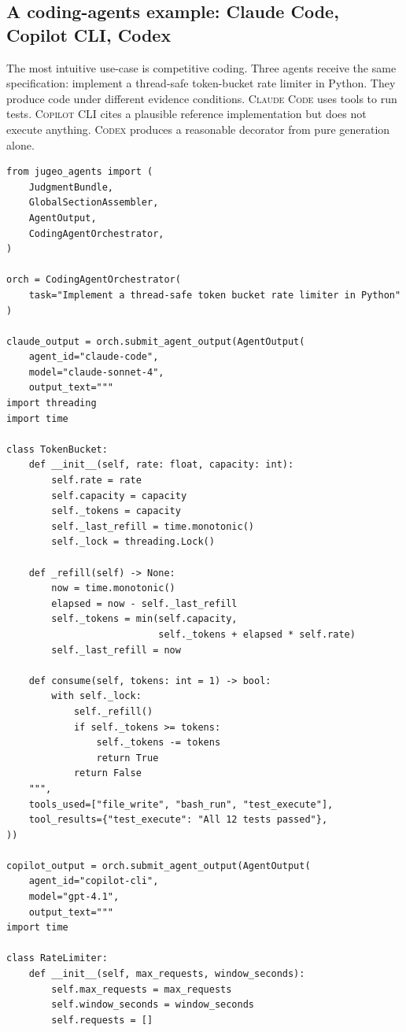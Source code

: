 \documentclass[11pt]{article}
\newcommand{\ClaudeCode}{\textsc{Claude Code}}
\newcommand{\CopilotCLI}{\textsc{Copilot CLI}}
\newcommand{\CodexCLI}{\textsc{Codex}}
\begin{document}
\subsection{A coding-agents example: Claude Code, Copilot CLI, Codex}

The most intuitive use-case is competitive coding.  Three agents receive the
same specification: implement a thread-safe token-bucket rate limiter in
Python.  They produce code under different evidence conditions.
\ClaudeCode{} uses tools to run tests.  \CopilotCLI{} cites a plausible
reference implementation but does not execute anything.  \CodexCLI{} produces a
reasonable decorator from pure generation alone.

\begin{lstlisting}[style=jugeo-python,caption={Competitive coding with three agent CLIs.},label={lst:coding-agents}]
from jugeo_agents import (
    JudgmentBundle,
    GlobalSectionAssembler,
    AgentOutput,
    CodingAgentOrchestrator,
)

orch = CodingAgentOrchestrator(
    task="Implement a thread-safe token bucket rate limiter in Python"
)

claude_output = orch.submit_agent_output(AgentOutput(
    agent_id="claude-code",
    model="claude-sonnet-4",
    output_text="""
import threading
import time

class TokenBucket:
    def __init__(self, rate: float, capacity: int):
        self.rate = rate
        self.capacity = capacity
        self._tokens = capacity
        self._last_refill = time.monotonic()
        self._lock = threading.Lock()

    def _refill(self) -> None:
        now = time.monotonic()
        elapsed = now - self._last_refill
        self._tokens = min(self.capacity,
                           self._tokens + elapsed * self.rate)
        self._last_refill = now

    def consume(self, tokens: int = 1) -> bool:
        with self._lock:
            self._refill()
            if self._tokens >= tokens:
                self._tokens -= tokens
                return True
            return False
    """,
    tools_used=["file_write", "bash_run", "test_execute"],
    tool_results={"test_execute": "All 12 tests passed"},
))

copilot_output = orch.submit_agent_output(AgentOutput(
    agent_id="copilot-cli",
    model="gpt-4.1",
    output_text="""
import time

class RateLimiter:
    def __init__(self, max_requests, window_seconds):
        self.max_requests = max_requests
        self.window_seconds = window_seconds
        self.requests = []


\end{lstlisting}
\end{document}
